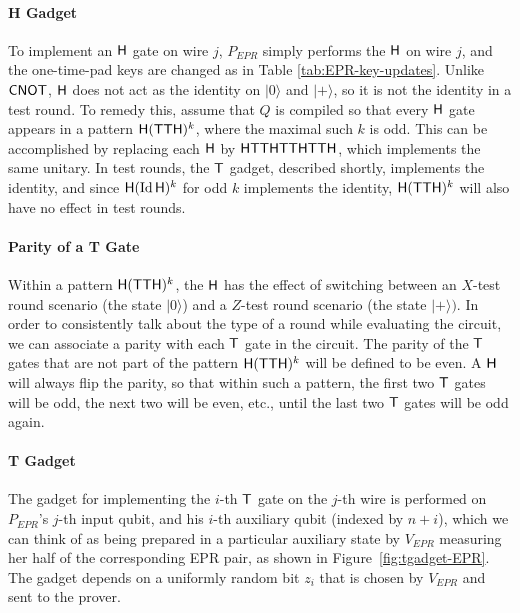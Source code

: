 \documentclass[11pt]{article}
\newcommand{\ket}[1]{|#1\rangle}
\newcommand{\Id}{\ensuremath{\mathop{\rm Id}\nolimits}}
\begin{document}
\paragraph{H Gadget} To implement an $\sf H$ gate on wire $j$, $P_{EPR}$ simply performs the $\sf H$ on wire $j$, and the one-time-pad keys are changed as in Table \ref{tab:EPR-key-updates}. Unlike $\sf CNOT$, $\sf H$ does not act as the identity on $\ket{0}$ and $\ket{+}$, so it is not the identity in a test round. To remedy this, assume that $Q$ is compiled so that every $\sf H$ gate appears in a pattern ${\sf H}({\sf TTH})^k$, where the maximal such $k$ is odd. This can be accomplished by replacing each $\sf H$ by $\sf HTTHTTHTTH$, which implements the same unitary. In test rounds, the $\sf T$ gadget, described shortly, implements the identity, and since ${\sf H}(\Id {\sf H})^k$ for odd $k$ implements the identity, ${\sf H}({\sf TTH})^k$ will also have no effect in test rounds. 

\paragraph{Parity of a T Gate} Within a pattern ${\sf H}({\sf TTH})^k$, the $\sf H$ has the effect of switching between an $X$-test round scenario (the state $\ket{0}$) and a $Z$-test round scenario (the state $\ket{+})$. In order to consistently talk about the type of a round while evaluating the circuit, we can associate a parity with each $\sf T$ gate in the circuit. The parity of the $\sf T$ gates that are not part of the pattern ${\sf H}({\sf TTH})^k$ will be defined to be even. A ${\sf H}$ will always flip the parity, so that within such a pattern, the first two ${\sf T}$ gates will be odd, the next two will be even, etc., until the last two $\sf T$ gates will be odd again. 

\paragraph{T Gadget} The gadget for implementing the $i$-th $\sf T$ gate on the $j$-th wire is performed on $P_{EPR}$'s $j$-th input qubit, and his $i$-th auxiliary qubit (indexed by $n+i$), which we can think of as being prepared in a particular auxiliary state by $V_{EPR}$ measuring her half of the corresponding EPR pair, as shown in Figure~\ref{fig:tgadget-EPR}. The gadget depends on a uniformly random bit $z_i$ that is chosen by $V_{EPR}$ and sent to the prover. 
\end{document}

